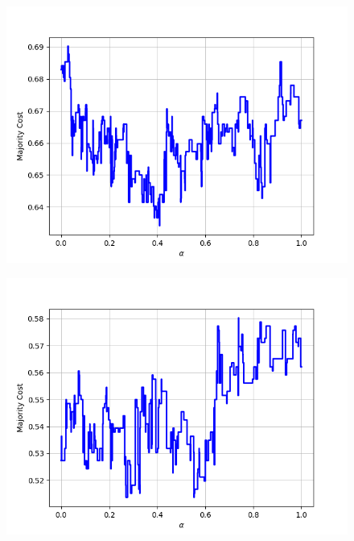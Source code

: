\begin{figure}[h]
\begin{minipage}{.19\textwidth}
  {\includegraphics[width=\linewidth]{plots/omniglot-intra-ac-cnn/Malay_(Jawi_-_Arabic)}}
\end{minipage}
\begin{minipage}{.19\textwidth}
  \centering
  {\includegraphics[width=\linewidth]{plots/omniglot-intra-ac-cnn/Mkhedruli_(Georgian)}}
\end{minipage}
\begin{minipage}{.19\textwidth}
  \centering

\end{minipage}
\end{figure}
